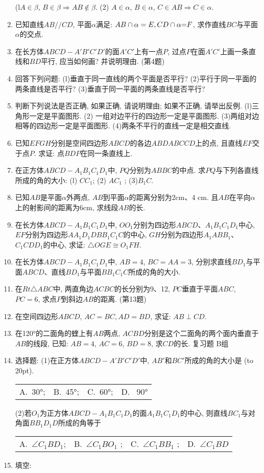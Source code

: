 \documentclass[10pt,a4paper]{article}
\newcommand{\bracket}[1]{(\hbox to #1pt{})}
\newcommand{\fourch}[4]{\par\begin{tabular}{p{.23\textwidth}p{.23\textwidth}p{.23\textwidth}p{.23\textwidth}}
A.~#1 &B.~#2& C.~#3& D.~#4
\end{tabular}}
\begin{document}
\begin{enumerate}[1.]
(l$A\in \beta$, $B\in \beta \Rightarrow AB\not\in \beta$.
(2) $A\in \alpha$, $B\in \alpha$, $C\in AB\Rightarrow C\in \alpha$.
\item 已知直线$AB//CD$, 平面$\alpha$满足: $AB\cap \alpha =E,CD\cap \alpha \text=F$, 求作直线$BC$与平面$\alpha$的交点.
\item 在长方体$ABCD-A'B'C'D'$的面$A'C'$上有一点$P$, 过点$P$在面$A'C'$上画一条直线和$BD$平行, 应当如何画? 并说明理由.
(第4题)
\item 回答下列问题:
(l)垂直于同一直线的两个平面是否平行?
(2)平行于同一平面的两条直线是否平行?
(3)垂直于同一平面的两条直线是否平行?
\item 判断下列说法是否正确, 如果正确, 请说明理由; 如果不正确, 请举出反例.
(l)三角形一定是平面图形.
(2) 一组对边平行的四边形一定是平面图形.
(3)两组对边相等的四边形一定是平面图形.
(4)两条不平行的直线一定是相交直线.
\item 已知$EFGH$分别是空间四边形$ABCD$的各边$ABDABCCD$上的点, 且直线$EF$交于点$P$. 求证: 点$BDP$在同一条直线上.
\item 在正方体$ABCD-A_1B_1C_1D_1$中, $PQ$分别为$ABBC$的中点. 求$PQ$与下列各直线所成的角的大小:
(l) $CC_1$;  (2) $AC_1$ ; (3)$B_1C$.
\item 已知$AB$是平面$\alpha$外两点, $AB$到平面$\alpha$的距离分别为2cm、4 cm. 且$AB$在平向$\alpha$上的射影间的距离为6cm, 求线段$AB$的长.
\item 在长方体$ABCD-A_1B_1C_1D_1$中, $OO_1$分别为四边形$ABCD$、$A_1B_1C_1D_1$中心, $EF$分别为四边形$AA_1D_1DBB_1C_1C$的中心, $GH$分别为四边形$A_1ABB_1$、$C_1CDD_1$的中心, 求证: $\triangle OGE\cong O_1FH$.
\item 在长方体$ABCD-A_1B_1C_1D_1$中, $AB=4$, $BC=AA=3$, 分别求直线$BD_1$与平面$ABCD$、直线$BD_1$与平面$BB_1C_1C$所成的角的大小.
\item 在$Rt\triangle ABC$中, 两直角边$ACBC$的长分别为9、12, $PC$垂直于平面$ABC$, $PC=6$, 求点$P$到斜边$AB$的距离.
(第13题)
\item 在空间四边形$ABCD$, $AC=BC,AD=BD$, 求证: $AB\perp CD$.
\item 在120°的二面角的蝰上有$AB$两点, $ACBD$分别是这个二面角的两个面内垂直于$AB$的线段, 已知: $AB=4$, $AC=6$, $BD=8$, 求$CD$的长.
复习题
B组
\item 选择题:
(1)在正方体$ABCD-A'B'C'D'$中, $AB'$和$BC'$所成的角的大小是    \bracket{20}.
\fourch{30°;}{45°;}{60°;}{ 90°}
(2)若$O_1$为正方体$ABCD-A_1B_1C_1D_1$的面$A_1B_1C_1D_1$的中心, 则直线$BC_1$与对角面$BB_1D_1D$所成的角等于
\fourch{$\angle C_1BD_1$;}{$\angle C_1BO_1$ ;}{$\angle C_1BB_1$ ;}{$\angle C_1BD$}
\item 填空:

\end{enumerate}
\end{document}
